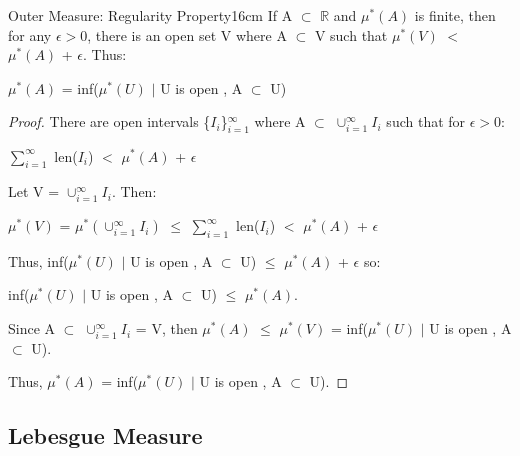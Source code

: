     \vspace{0.5cm}



    \begin{wtheorem}{Outer Measure: Regularity Property}{16cm}
        If A $\subset$ $\mathbb{R}$ and $\mu^*(A)$ is finite,
        then for any $\epsilon > 0$, there is an open set V
        where A $\subset$ V such that
        $\mu^*(V)$ $<$ $\mu^*(A)$ + $\epsilon$. Thus:

        \hspace{0.5cm}
        $\mu^*(A)$ = inf($\mu^*(U)$ $|$ U is open , A $\subset$ U)
    \end{wtheorem}

    \begin{proof}
        There are open intervals \{$I_i$\}$_{i=1}^{\infty}$
        where A $\subset$ $\cup_{i=1}^{\infty} I_i$ such that
        for $\epsilon > 0$:

        \hspace{0.5cm}
        $\sum_{i=1}^{\infty}$ len($I_i$)
        $<$ $\mu^*(A)$ + $\epsilon$

        Let V = $\cup_{i=1}^{\infty} I_i$. Then:

        \hspace{0.5cm}
        $\mu^*(V)$
        = $\mu^*(\cup_{i=1}^{\infty} I_i)$
        $\leq$ $\sum_{i=1}^{\infty}$ len($I_i$)
        $<$ $\mu^*(A)$ + $\epsilon$

        Thus,
        inf($\mu^*(U)$ $|$ U is open , A $\subset$ U)
        $\leq$ $\mu^*(A)$ + $\epsilon$ so:
        
        \hspace{0.5cm}
        inf($\mu^*(U)$ $|$ U is open , A $\subset$ U)
        $\leq$ $\mu^*(A)$.

        Since A $\subset$ $\cup_{i=1}^{\infty} I_i$ = V, then
        $\mu^*(A)$ $\leq$ $\mu^*(V)$
        = inf($\mu^*(U)$ $|$ U is open , A $\subset$ U).

        Thus, $\mu^*(A)$ = inf($\mu^*(U)$ $|$ U is open , A $\subset$ U).
    \end{proof}

    \newpage





\subsection{ Lebesgue Measure }

